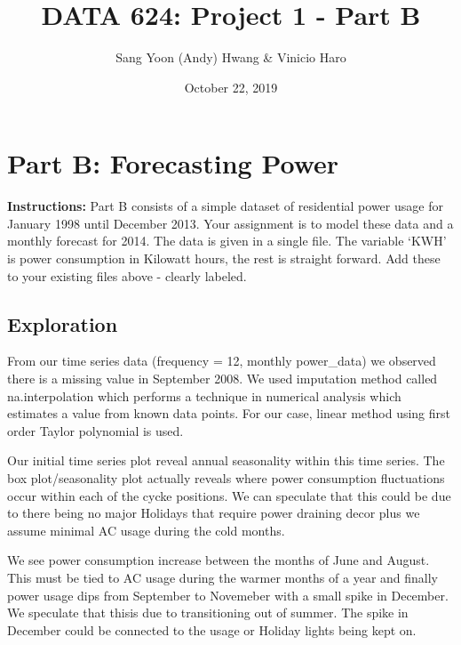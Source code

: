 \documentclass[openany]{book}
\title{DATA 624: Project 1 - Part B}
\author{Sang Yoon (Andy) Hwang \& Vinicio Haro}
\date{October 22, 2019}
\renewenvironment{quote}{\begin{myquote}}{\end{myquote}}
\begin{document}
\maketitle

{
\setcounter{tocdepth}{1}
\tableofcontents
}
\hypertarget{part-b}{%
\chapter*{Part B: Forecasting Power}\label{part-b}}

\begin{quote}
\textbf{Instructions:} Part B consists of a simple dataset of
residential power usage for January 1998 until December 2013. Your
assignment is to model these data and a monthly forecast for 2014. The
data is given in a single file. The variable `KWH' is power consumption
in Kilowatt hours, the rest is straight forward. Add these to your
existing files above - clearly labeled.
\end{quote}

\hypertarget{b-exploration}{%
\section*{Exploration}\label{b-exploration}}

From our time series data (frequency = 12, monthly power\_data) we
observed there is a missing value in September 2008. We used imputation
method called na.interpolation which performs a technique in numerical
analysis which estimates a value from known data points. For our case,
linear method using first order Taylor polynomial is used.

Our initial time series plot reveal annual seasonality within this time
series. The box plot/seasonality plot actually reveals where power
consumption fluctuations occur within each of the cycke positions. We
can speculate that this could be due to there being no major Holidays
that require power draining decor plus we assume minimal AC usage during
the cold months.

We see power consumption increase between the months of June and August.
This must be tied to AC usage during the warmer months of a year and
finally power usage dips from September to Novemeber with a small spike
in December. We speculate that thisis due to transitioning out of
summer. The spike in December could be connected to the usage or Holiday
lights being kept on.
\end{document}
